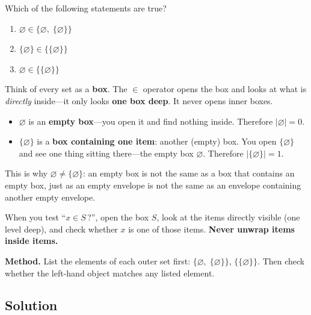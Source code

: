 \documentclass[12pt, a4paper]{article}
\begin{document}
\begin{problembox}
Which of the following statements are true?
\begin{enumerate}[label=2.\arabic*.]
  \item $\varnothing \in \{\varnothing,\; \{\varnothing\}\}$
  \item $\{\varnothing\} \in \{\{\varnothing\}\}$
  \item $\varnothing \in \{\{\varnothing\}\}$
\end{enumerate}
\end{problembox}

\medskip
\begin{tcolorbox}[colback=blue!3, colframe=setA!60!black, arc=2mm, left=5pt, right=5pt, top=5pt, bottom=5pt, title={\small Box Analogy: How $\in$ Works}]
Think of every set as a \textbf{box}. The $\in$ operator opens the box and looks at what is \emph{directly} inside---it only looks \textbf{one box deep}. It never opens inner boxes.

\begin{itemize}[nosep]
  \item $\varnothing$ is an \textbf{empty box}---you open it and find nothing inside.
        Therefore $|\varnothing| = 0$.
  \item $\{\varnothing\}$ is a \textbf{box containing one item}: another (empty) box.
        You open $\{\varnothing\}$ and see one thing sitting there---the empty box $\varnothing$.
        Therefore $|\{\varnothing\}| = 1$.
\end{itemize}

\medskip
This is why $\varnothing \neq \{\varnothing\}$: an empty box is not the same as a box that contains an empty box, just as an empty envelope is not the same as an envelope containing another empty envelope.

When you test ``$x \in S$\,?'', open the box $S$, look at the items directly visible (one level deep), and check whether $x$ is one of those items. \textbf{Never unwrap items inside items.}
\end{tcolorbox}

\medskip
\textbf{Method.}\; List the elements of each outer set first: $\{\varnothing,\;\{\varnothing\}\}$, $\{\{\varnothing\}\}$. Then check whether the left-hand object matches any listed element.

\subsection*{Solution}
\end{document}
